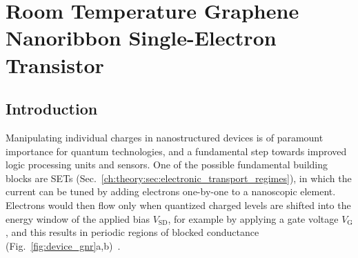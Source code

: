 \chapter{\label{ch:gnrset}Room Temperature Graphene Nanoribbon Single-Electron Transistor}

\minitoc

\section{Introduction}\label{ch:gnrset:sec:intro}

Manipulating individual charges in nanostructured devices is of paramount importance for quantum technologies, and a fundamental step towards improved logic processing units and sensors. One of the possible fundamental building blocks are \glspl{SET} (Sec.~\ref{ch:theory:sec:electronic_transport_regimes}), in which the current can be tuned by adding electrons one-by-one to a nanoscopic element. Electrons would then flow only when quantized charged levels are shifted into the energy window of the applied bias $V_\textrm{SD}$, for example by applying a gate voltage $V_\textrm{G}$, and this results in periodic regions of blocked conductance (Fig.~\ref{fig:device_gnr}a,b)~\cite{stampfer2008tunable}.

